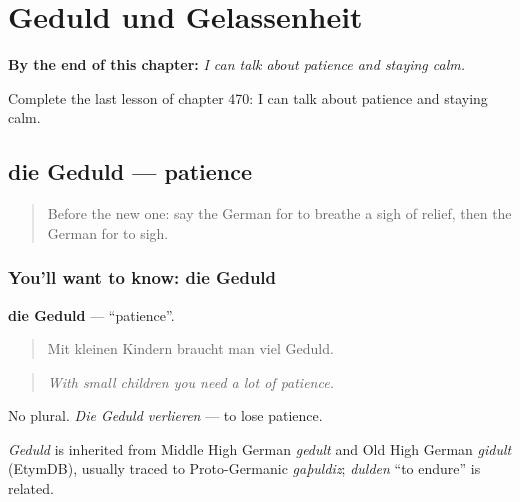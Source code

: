 
\chapter{Geduld und Gelassenheit}
\label{ch:ge-geduld-und-gelassenheit}

\begin{chapteropening}
\textbf{By the end of this chapter:} \emph{I can talk about patience and staying calm.}

Complete the last lesson of chapter 470: I can talk about patience and staying calm.
\end{chapteropening}

\section[die Geduld]{die Geduld — patience}

\label{lesson:GE-C470-geduld}



\begin{quote}
Before the new one: say the German for to breathe a sigh of relief, then the German for to sigh.
\end{quote}

\subsection*{You'll want to know: die Geduld}
\textbf{die Geduld} — \textquotedblleft{}patience\textquotedblright{}.

\begin{quote}
Mit kleinen Kindern braucht man viel Geduld.
\end{quote}

\begin{quote}
\emph{With small children you need a lot of patience.}
\end{quote}

No plural. \emph{Die Geduld verlieren} — to lose patience.

\begin{cousinweb}
\emph{Geduld} is inherited from Middle High German \emph{gedult} and Old High German \emph{gidult} (EtymDB), usually traced to Proto-Germanic \emph{gaþuldiz}; \emph{dulden} \textquotedblleft{}to endure\textquotedblright{} is related.
\end{cousinweb}

